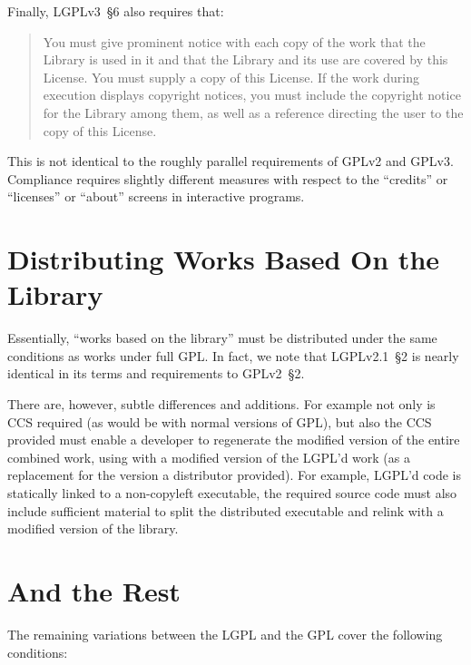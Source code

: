 Finally, LGPLv3~\S6 also requires that:

\begin{quote}
    You must give prominent notice with each copy of the work that the
    Library is used in it and that the Library and its use are covered by
    this License. You must supply a copy of this License. If the work during
    execution displays copyright notices, you must include the copyright
    notice for the Library among them, as well as a reference directing the
    user to the copy of this License.
\end{quote}

This is not identical to the roughly parallel requirements of GPLv2 and
GPLv3. Compliance requires slightly different measures with respect to the
``credits'' or ``licenses'' or ``about'' screens in interactive programs.

\section{Distributing Works Based On the Library}

Essentially, ``works based on the library'' must be distributed under the
same conditions as works under full GPL\@. In fact, we note that 
LGPLv2.1~\S2 is nearly identical in its terms and requirements to GPLv2~\S2.

There are, however, subtle differences and additions.  For example not only
is CCS required (as would be with normal versions of GPL), but also the CCS
provided must enable a developer to regenerate the modified version of the
entire combined work, using with a modified version of the LGPL'd work (as a
replacement for the version a distributor provided).  For example, LGPL'd
code is statically linked to a non-copyleft executable, the required source
code must also include sufficient material to split the distributed
executable and relink with a modified version of the library.

\section{And the Rest}

The remaining variations between the LGPL and the GPL cover the following
conditions:

